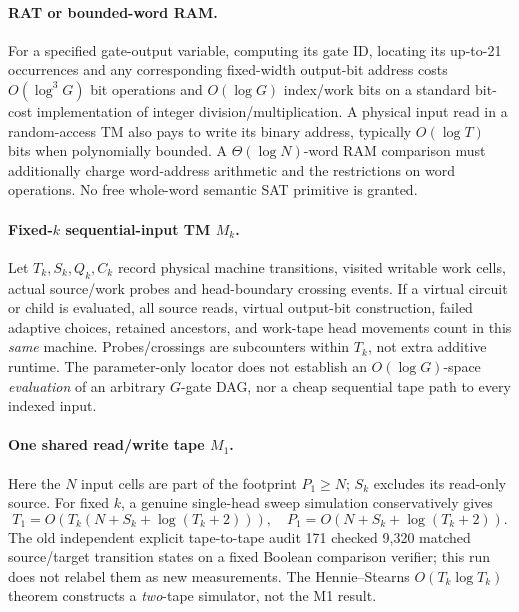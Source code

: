 \documentclass[11pt]{article}
\begin{document}
\paragraph{RAT or bounded-word RAM.}
For a specified gate-output variable, computing its gate ID,
locating its up-to-21 occurrences and any corresponding
fixed-width output-bit address costs $O(\log^3G)$ bit operations
and $O(\log G)$ index/work bits on a standard bit-cost
implementation of integer division/multiplication. A physical
input read in a random-access TM also pays to write its binary
address, typically $O(\log T)$ bits when polynomially bounded.
A $\Theta(\log N)$-word RAM comparison must additionally charge
word-address arithmetic and the restrictions on word operations.
No free whole-word semantic SAT primitive is granted.

\paragraph{Fixed-$k$ sequential-input TM $M_k$.}
Let $T_k,S_k,Q_k,C_k$ record physical machine transitions,
visited writable work cells, actual source/work probes and
head-boundary crossing events. If a virtual circuit or child
is evaluated, all source reads, virtual output-bit construction,
failed adaptive choices, retained ancestors, and work-tape head
movements count in this \emph{same} machine. Probes/crossings
are subcounters within $T_k$, not extra additive runtime.
The parameter-only locator does not establish an
$O(\log G)$-space \emph{evaluation} of an arbitrary $G$-gate
DAG, nor a cheap sequential tape path to every indexed input.

\paragraph{One shared read/write tape $M_1$.}
Here the $N$ input cells are part of the footprint $P_1\ge N$;
$S_k$ excludes its read-only source. For fixed $k$, a genuine
single-head sweep simulation conservatively gives
\[
 T_1=O\!\left(T_k(N+S_k+\log(T_k+2))\right),\quad
 P_1=O\!\left(N+S_k+\log(T_k+2)\right).                 \tag{13}
\]
The old independent explicit tape-to-tape audit 171 checked
9,320 matched source/target transition states on a fixed
Boolean comparison verifier; this run does not relabel them as
new measurements. The Hennie--Stearns $O(T_k\log T_k)$ theorem
constructs a \emph{two}-tape simulator, not the M1 result.
\end{document}
